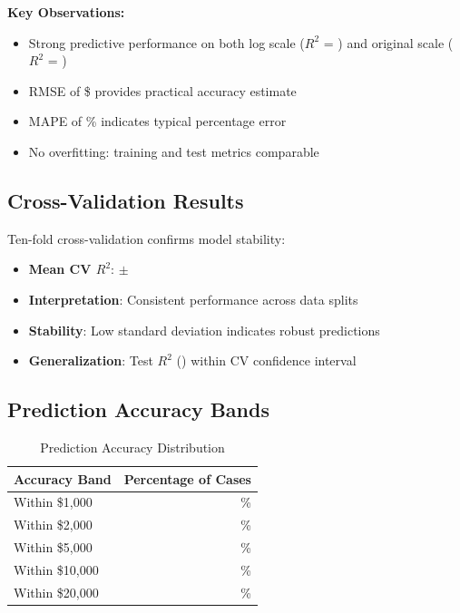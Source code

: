 \textbf{Key Observations:}
\begin{itemize}
    \item Strong predictive performance on both log scale ($R^2$ = \ModelSixRSquaredLogScale{}) and original scale ($R^2$ = \ModelSixRSquaredTest{})
    \item RMSE of \$\ModelSixRMSETest{} provides practical accuracy estimate
    \item MAPE of \ModelSixMAPETest{}\% indicates typical percentage error
    \item No overfitting: training and test metrics comparable
\end{itemize}

\subsection{Cross-Validation Results}

Ten-fold cross-validation confirms model stability:

\begin{itemize}
    \item \textbf{Mean CV $R^2$}: \ModelSixCVMean{} $\pm$ \ModelSixCVStd{}
    \item \textbf{Interpretation}: Consistent performance across data splits
    \item \textbf{Stability}: Low standard deviation indicates robust predictions
    \item \textbf{Generalization}: Test $R^2$ (\ModelSixRSquaredTest{}) within CV confidence interval
\end{itemize}

\subsection{Prediction Accuracy Bands}

\begin{table}[h]
\centering
\caption{Prediction Accuracy Distribution}
\begin{tabular}{lr}
\toprule
\textbf{Accuracy Band} & \textbf{Percentage of Cases} \\
\midrule
Within \$1,000 & \ModelSixWithinOneK{}\% \\
Within \$2,000 & \ModelSixWithinTwoK{}\% \\
Within \$5,000 & \ModelSixWithinFiveK{}\% \\
Within \$10,000 & \ModelSixWithinTenK{}\% \\
Within \$20,000 & \ModelSixWithinTwentyK{}\% \\
\bottomrule
\end{tabular}
\end{table}

